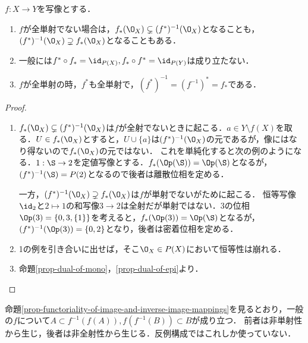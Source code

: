 \documentclass[uplatex,dvipdfmx]{jsreport}
\begin{document}
\begin{lemma}
    $f:X\to Y$を写像とする．
    \begin{enumerate}
        \item $f$が全単射でない場合は，$f_*(\O_X)\subsetneq (f^*)^{-1}(\O_X)$となることも，$(f^*)^{-1}(\O_X)\supsetneq f_*(\O_X)$となることもある．
        \item 一般には$f^*\circ f_*=\id_{P(X)},f_*\circ f^*=\id_{P(Y)}$は成り立たない．
        \item $f$が全単射の時，$f^*$も全単射で，$(f^*)^{-1}=(f^{-1})^*=f_*$である．
    \end{enumerate}
\end{lemma}
\begin{proof}\mbox{}
    \begin{enumerate}
        \item $f_*(\O_X)\subsetneq (f^*)^{-1}(\O_X)$は$f$が全射でないときに起こる．$a\in Y\setminus f(X)$を取る．$U\in f_*(\O_X)$とすると，$U\cup\{a\}$は$(f^*)^{-1}(\O_X)$の元であるが，像にはなり得ないので$f_*(\O_X)$の元ではない．
        これを単純化すると次の例のようになる．$1:\S\to 2$を定値写像とする．$f_*(\Op(\S))=\Op(\S)$となるが，$(f^*)^{-1}(\S)=P(2)$となるので後者は離散位相を定める．

        一方，$(f^*)^{-1}(\O_X)\supsetneq f_*(\O_X)$は$f$が単射でないがために起こる．
        恒等写像$\id_2$と$2\mapsto 1$の和写像$3\to 2$は全射だが単射ではない．$3$の位相$\Op(3)=\{0,3,\{1\}\}$を考えると，$f_*(\Op(3))=\Op(\S)$となるが，$(f^*)^{-1}(\Op(3))=\{0,2\}$となり，後者は密着位相を定める．
        \item 1の例を引き合いに出せば，そこ$\O_X\in P(X)$において恒等性は崩れる．
        \item 命題\ref{prop-dual-of-mono}，\ref{prop-dual-of-epi}より．
    \end{enumerate}
\end{proof}
\begin{remarks}
    命題\ref{prop-functoriality-of-image-and-inverse-image-mappings}を見るとおり，一般の$f$について$A\subset f^{-1}(f(A)),f(f^{-1}(B))\subset B$が成り立つ．
    前者は非単射性から生じ，後者は非全射性から生じる．反例構成ではこれしか使っていない．
\end{remarks}
\end{document}
